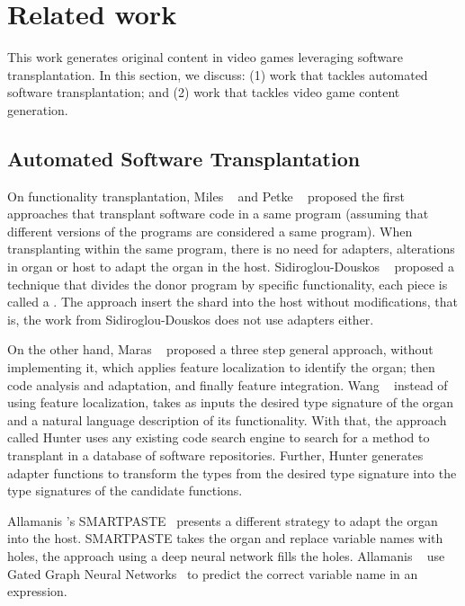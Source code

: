 \section{Related work} \label{sec:Related}

This work generates original content in video games leveraging software transplantation. In this section, we discuss: (1) work that tackles automated software transplantation; and (2) work that tackles video game content generation.

\subsection{Automated Software Transplantation}

On functionality transplantation, Miles \etal~\cite{miles2012situ} and Petke \etal~\cite{petke2014using} proposed the first approaches that transplant software code in a same program (assuming that different versions of the programs are considered a same program). When transplanting within the same program, there is no need for adapters, alterations in organ or host to adapt the organ in the host. Sidiroglou-Douskos \etal~\cite{sidiroglou2015horizontal} proposed a technique that divides the donor program by specific functionality, each piece is called a . The approach insert the shard into the host without modifications, that is, the work from Sidiroglou-Douskos does not use adapters either.

On the other hand, Maras \etal~\cite{maras2015towards} proposed a three step general approach, without implementing it, which applies feature localization to identify the organ; then code analysis and adaptation, and finally feature integration. Wang \etal~\cite{wang2016hunter} instead of using feature localization, takes as inputs the desired type signature of the organ and a natural language description of its functionality. With that, the approach called Hunter uses any existing code search engine to search for a method to transplant in a database of software repositories. Further, Hunter generates adapter functions to transform the types from the desired type signature into the type signatures of the candidate functions.

Allamanis \etal's SMARTPASTE~\cite{allamanis2017smartpaste} presents a different strategy to adapt the organ into the host. SMARTPASTE takes the organ and replace variable names with holes, the approach using a deep neural network fills the holes. Allamanis \etal~\cite{allamanis2017smartpaste} use Gated Graph Neural Networks~\cite{li2015gated} to predict the correct variable name in an expression.

